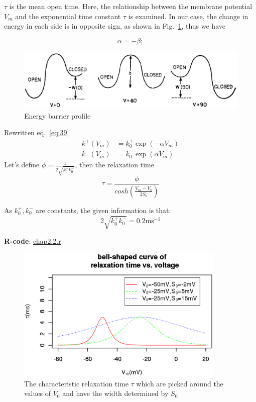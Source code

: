 $\tau$ is the mean open time. Here, the relationship between the membrane
potential $V_m$ and the exponential time constant $\tau$ is examined.  In our
case, the change in energy in each side is in opposite sign, as shown in
Fig.~\ref{fig:energy_profile}, thus we have

\begin{equation}
  \label{eq:53}
  \alpha = -\beta;
\end{equation}

\begin{figure}[hbt]
  \centerline{\includegraphics[height=3cm]{./images/energy_configuration.eps}}
  \caption{Energy barrier profile }
  \label{fig:energy_profile}
\end{figure}

Rewritten eq.~\eqref{eq:39}
\begin{equation}
  \label{eq:58}
  \begin{split}
    k^+(V_m) &= k_0^+ \exp(-\alpha V_m) \\
    k^-(V_m) &= k_0^-  \exp(\alpha V_m)
  \end{split}
\end{equation}
Let's define $\phi =
\frac{1}{2\sqrt{k_0^+k_0^-}}$, then the relaxation time
\begin{equation}
  \label{eq:46}
  \tau = \frac{\phi}{cosh(\frac{V_m-V_0}{2S_0})}
\end{equation}

As $k_0^+, k_0^-$ are constants, the given information is that:
\begin{equation}
  \label{eq:86}
  2\sqrt{k_0^+k_0^-} = 0.2\text{ms}^{-1}
\end{equation}

{\bf R-code}: \hyperref[chap2.2.r]{chap2.2.r}


\begin{figure}[htb]
  \centerline{\includegraphics[height=6.5cm]{./images/chap2_tau_V.eps}}
  \caption{The characteristic relaxation time $\tau$ which are picked
    around the values of $V_0$ and have the width determined by $S_0$}\label{fig:tau_V}
\end{figure}

